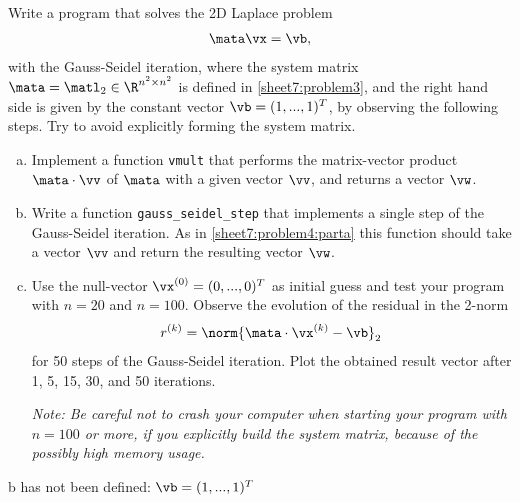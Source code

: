 \begin{Sheet}
  \begin{Problem}[Programming]
    \label{sheet7:problem4}
    Write a program that solves the 2D Laplace problem
    \begin{gather*}
      \mata\vx=\vb,
    \end{gather*}
    with the Gauss-Seidel iteration, where the system matrix
    $\mata=\matl_2\in\R^{n^2\times n^2}$ is defined in
    \cref{sheet7:problem3}, and the right hand side is given by the
    constant vector $\vb=(1,...,1)^T$, by observing the following
    steps. Try to avoid explicitly forming the system matrix.
    \begin{enumerate}[(a)]
    \item\label{sheet7:problem4:parta} Implement a function
      \lstinline{vmult} that performs the matrix-vector product
      $\mata\cdot\vv$ of $\mata$ with a given vector $\vv$, and
      returns a vector $\vw$.
    \item Write a function \lstinline{gauss_seidel_step} that
      implements a single step of the Gauss-Seidel iteration. As in
      \eqref{sheet7:problem4:parta} this function should take a vector
      $\vv$ and return the resulting vector $\vw$.
    \item Use the null-vector $\vx^{(0)} = (0,...,0)^T$ as initial
      guess and test your program with $n=20$ and $n=100$. Observe the
      evolution of the residual in the 2-norm
      \begin{gather*}
        r^{(k)} = \norm{\mata\cdot\vx^{(k)}-\vb}_2
      \end{gather*}
      for 50 steps of the Gauss-Seidel iteration.  Plot the obtained
      result vector after 1, 5, 15, 30, and 50 iterations.

      \textit{Note: Be careful not to crash your computer when
        starting your program with $n=100$ or more, if you explicitly
        build the system matrix, because of the possibly high memory
        usage.}
    \end{enumerate}

    \begin{todo}
      b has not been defined: $\vb=(1,...,1)^T$
    \end{todo}
  \end{Problem}

\end{Sheet}



